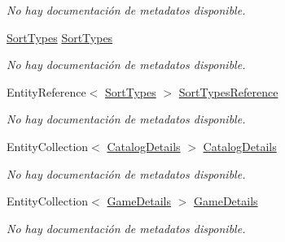 \begin{DoxyCompactItemize}
\begin{DoxyCompactList}\small\item\em No hay documentación de metadatos disponible. \end{DoxyCompactList}\item 
\hyperlink{class_microsoft_1_1_samples_1_1_kinect_1_1_basic_interactions_1_1_sort_types}{Sort\-Types} \hyperlink{class_microsoft_1_1_samples_1_1_kinect_1_1_basic_interactions_1_1_adverts_a818b7e1ce3542131e1e7e70e36bd4b6e}{Sort\-Types}
\begin{DoxyCompactList}\small\item\em No hay documentación de metadatos disponible. \end{DoxyCompactList}\item 
Entity\-Reference$<$ \hyperlink{class_microsoft_1_1_samples_1_1_kinect_1_1_basic_interactions_1_1_sort_types}{Sort\-Types} $>$ \hyperlink{class_microsoft_1_1_samples_1_1_kinect_1_1_basic_interactions_1_1_adverts_a8d28e2f7dbc021037f4f3716bd50f82e}{Sort\-Types\-Reference}
\begin{DoxyCompactList}\small\item\em No hay documentación de metadatos disponible. \end{DoxyCompactList}\item 
Entity\-Collection$<$ \hyperlink{class_microsoft_1_1_samples_1_1_kinect_1_1_basic_interactions_1_1_catalog_details}{Catalog\-Details} $>$ \hyperlink{class_microsoft_1_1_samples_1_1_kinect_1_1_basic_interactions_1_1_adverts_a7de65ee5067d3073f8358c5de9e75c2f}{Catalog\-Details}
\begin{DoxyCompactList}\small\item\em No hay documentación de metadatos disponible. \end{DoxyCompactList}\item 
Entity\-Collection$<$ \hyperlink{class_microsoft_1_1_samples_1_1_kinect_1_1_basic_interactions_1_1_game_details}{Game\-Details} $>$ \hyperlink{class_microsoft_1_1_samples_1_1_kinect_1_1_basic_interactions_1_1_adverts_a617ef08affcc4c9c85af478ceb12be3e}{Game\-Details}
\begin{DoxyCompactList}\small\item\em No hay documentación de metadatos disponible. \end{DoxyCompactList}\end{DoxyCompactItemize}


